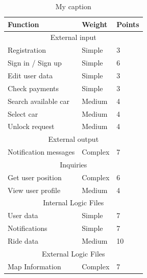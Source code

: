 \documentclass[12pt]{article}
\begin{document}
	 \begin{table}[]
\centering
\caption{My caption}
\label{my-label}
\begin{tabular}{|l|l|l|}
\hline
Function               & Weight   & Points \\ \hline
\multicolumn{3}{|c|}{External input}       \\ \hline
Registration           & Simple   & 3      \\ \hline
Sign in / Sign up      & Simple   & 6      \\ \hline
Edit user data         & Simple   & 3      \\ \hline
Check payments         & Simple   & 3      \\ \hline
Search available car   & Medium   & 4      \\ \hline
Select car             & Medium   & 4      \\ \hline
Unlock request         & Medium   & 4      \\ \hline
\multicolumn{3}{|c|}{External output}      \\ \hline
Notification messages  & Complex  & 7      \\ \hline
\multicolumn{3}{|c|}{Inquiries}            \\ \hline
Get user position      & Complex  & 6      \\ \hline
View user profile      & Medium   & 4      \\ \hline
\multicolumn{3}{|c|}{Internal Logic Files} \\ \hline
User data              & Simple   & 7      \\ \hline
Notifications          & Simple   & 7      \\ \hline
Ride data              & Medium   & 10     \\ \hline
\multicolumn{3}{|c|}{External Logic Files} \\ \hline
Map Information        & Complex  & 7      \\ \hline
\end{tabular}
\end{table}
	 
	
\end{document}
